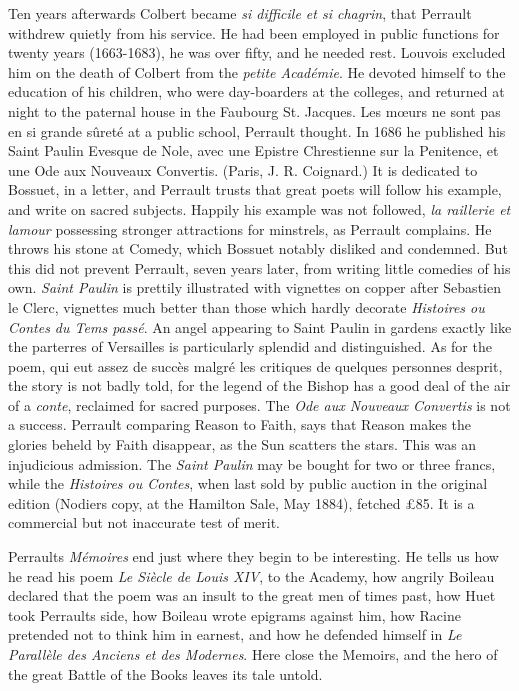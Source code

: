 \documentclass[14pt,a4paper]{memoir}
\begin{document}
Ten years afterwards Colbert became \emph{si difficile et si chagrin},
that Perrault withdrew quietly from his service. He had been employed in
public functions for twenty years (1663-1683), he was over fifty, and he
needed rest. Louvois excluded him on the death of Colbert from the
\emph{petite Académie}. He devoted himself to the education of his
children, who were \textquotesingle day-boarders\textquotesingle{} at
the colleges, and returned at night to the paternal house in the
Faubourg St. Jacques. \textquotesingle Les mœurs ne sont pas en si
grande sûreté\textquotesingle{} at a public school, Perrault thought. In
1686 he published his \textquotesingle Saint Paulin Evesque de Nole,
avec une Epistre Chrestienne sur la Penitence, et une Ode aux Nouveaux
Convertis.\textquotesingle{} (Paris, J. R. Coignard.) It is dedicated to
Bossuet, in a letter, and Perrault trusts that great poets will follow
his example, and write on sacred subjects. Happily his example was not
followed, \emph{la raillerie et l\textquotesingle amour} possessing
stronger attractions for minstrels, as Perrault complains. He throws his
stone at Comedy, which Bossuet notably disliked and condemned. But this
did not prevent Perrault, seven years later, from writing little
comedies of his own. \emph{Saint Paulin} is prettily illustrated with
vignettes on copper after Sebastien le Clerc, vignettes much better than
those which hardly decorate \emph{Histoires ou Contes du Tems passé}. An
angel appearing to Saint Paulin in gardens exactly like the parterres of
Versailles is particularly splendid and distinguished. As for the poem,
\textquotesingle qui eut assez de succès malgré les critiques de
quelques personnes d\textquotesingle esprit,\textquotesingle{} the story
is not badly told, for the legend of the Bishop has a good deal of the
air of a \emph{conte}, reclaimed for sacred purposes. The \emph{Ode aux
Nouveaux Convertis} is not a success. Perrault comparing Reason to
Faith, says that Reason makes the glories beheld by Faith disappear, as
the Sun scatters the stars. This was an injudicious admission. The
\emph{Saint Paulin} may be bought for two or three francs, while the
\emph{Histoires ou Contes}, when last sold by public auction in the
original edition (Nodier\textquotesingle s copy, at the Hamilton Sale,
May 1884), fetched £85. It is a commercial but not inaccurate test of
merit.

Perrault\textquotesingle s \emph{Mémoires} end just where they begin to
be interesting. He tells us how he read his poem \emph{Le Siècle de
Louis XIV}, to the Academy, how angrily Boileau declared that the poem
was an insult to the great men of times past, how Huet took
Perrault\textquotesingle s side, how Boileau wrote epigrams against him,
how Racine pretended not to think him in earnest, and how he defended
himself in \emph{Le Parallèle des Anciens et des Modernes}. Here close
the Memoirs, and the hero of the great Battle of the Books leaves its
tale untold.
\end{document}
